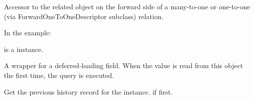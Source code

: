 \documentclass[letterpaper,10pt,english]{sphinxmanual}
\begin{document}
\begin{fulllineitems}

\begin{fulllineitems}
\label{\detokenize{modules/models:users.models.HistoricalCotisationHistory.paymentMethod}}
Accessor to the related object on the forward side of a many-to-one or
one-to-one (via ForwardOneToOneDescriptor subclass) relation.

In the example:

\begin{sphinxVerbatim}[commandchars=\\\{\}]
 
       
\end{sphinxVerbatim}

 is a  instance.

\end{fulllineitems}


\begin{fulllineitems}
\label{\detokenize{modules/models:users.models.HistoricalCotisationHistory.paymentMethod_id}}
A wrapper for a deferred-loading field. When the value is read from this
object the first time, the query is executed.

\end{fulllineitems}


\begin{fulllineitems}
\label{\detokenize{modules/models:users.models.HistoricalCotisationHistory.prev_record}}
Get the previous history record for the instance.  if first.


\end{fulllineitems}
\end{fulllineitems}
\end{document}

